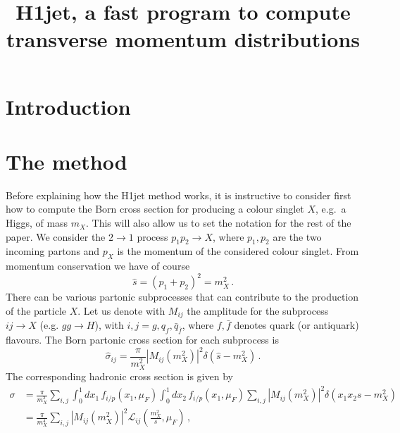 \documentclass[12pt,a4wide]{article}
\title{H1jet, a fast program to compute transverse momentum distributions}
\begin{document}
\maketitle


\section{Introduction}
\label{sec:intro}

\section{The method}
\label{sec:method}
Before explaining how the H1jet method works, it is instructive to consider first how to compute the Born cross
section for producing a colour singlet $X$, e.g.\ a Higgs, of mass
$m_X$. This will also allow us to set the notation for the rest of the
paper. We consider the $2\to 1$ process $p_1 p_2 \to X$, where
$p_1,p_2$ are the two incoming partons and $p_X$ is the momentum of
the considered colour singlet. From momentum conservation we have of course
\begin{equation}
  \label{eq:mom-conservation}
  \hat s = (p_1+p_2)^2=m_X^2\,.
\end{equation}
There can be various partonic subprocesses that can contribute to the
production of the particle $X$. Let us denote with $M_{ij}$ the
amplitude for the subprocess $ij\to X$ (e.g. $gg \to H$), with
$i,j=g,q_f,\bar q_{\bar f}$, where $f,\bar f$ denotes quark (or
antiquark) flavours. The Born partonic cross section for each
subprocess is
\begin{equation}
  \label{eq:Born-xsct}
  \hat\sigma_{ij}=\frac{\pi}{m_X^2} |M_{ij}(m_X^2)|^2 \delta\left(\hat s-m_X^2\right)\,.
\end{equation}
The corresponding hadronic cross section is given by
\begin{equation}
  \label{eq:Born-had}
  \begin{split}
  \sigma& =\frac{\pi}{m_X^2}\sum_{i,j} \int_0^1 dx_1\, f_{i/p}(x_1,\mu_F)\int_0^1 dx_2 \, f_{i/p}(x_1,\mu_F)\sum_{i,j}
 |M_{ij}(m_X^2)|^2 \delta\left(x_1 x_2 s-m_X^2\right)\\
   & = \frac{\pi}{m_X^4} \sum_{i,j} |M_{ij}(m_X^2)|^2 \mathcal{L}_{ij}\left(\frac{m_X^2}{s},\mu_F\right)
  \,,
    \end{split}
\end{equation}
\end{document}
